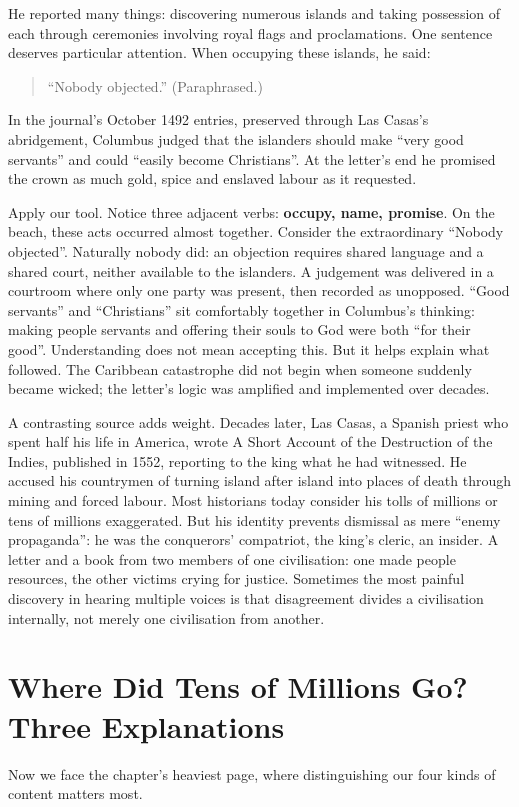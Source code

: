 He reported many things: discovering numerous islands and taking possession of each through ceremonies involving royal flags and proclamations. One sentence deserves particular attention. When occupying these islands, he said:

\begin{quote}
``Nobody objected.'' (Paraphrased.)
\end{quote}
In the journal's October 1492 entries, preserved through Las Casas's abridgement, Columbus judged that the islanders should make ``very good servants'' and could ``easily become Christians''. At the letter's end he promised the crown as much gold, spice and enslaved labour as it requested.

Apply our tool. Notice three adjacent verbs: \textbf{occupy, name, promise}. On the beach, these acts occurred almost together. Consider the extraordinary ``Nobody objected''. Naturally nobody did: an objection requires shared language and a shared court, neither available to the islanders. A judgement was delivered in a courtroom where only one party was present, then recorded as unopposed. ``Good servants'' and ``Christians'' sit comfortably together in Columbus's thinking: making people servants and offering their souls to God were both ``for their good''. Understanding does not mean accepting this. But it helps explain what followed. The Caribbean catastrophe did not begin when someone suddenly became wicked; the letter's logic was amplified and implemented over decades.

A contrasting source adds weight. Decades later, Las Casas, a Spanish priest who spent half his life in America, wrote A Short Account of the Destruction of the Indies, published in 1552, reporting to the king what he had witnessed. He accused his countrymen of turning island after island into places of death through mining and forced labour. Most historians today consider his tolls of millions or tens of millions exaggerated. But his identity prevents dismissal as mere ``enemy propaganda'': he was the conquerors' compatriot, the king's cleric, an insider. A letter and a book from two members of one civilisation: one made people resources, the other victims crying for justice. Sometimes the most painful discovery in hearing multiple voices is that disagreement divides a civilisation internally, not merely one civilisation from another.

\section[Where Did the Millions Go?]{Where Did Tens of Millions Go? Three Explanations}
Now we face the chapter's heaviest page, where distinguishing our four kinds of content matters most.

